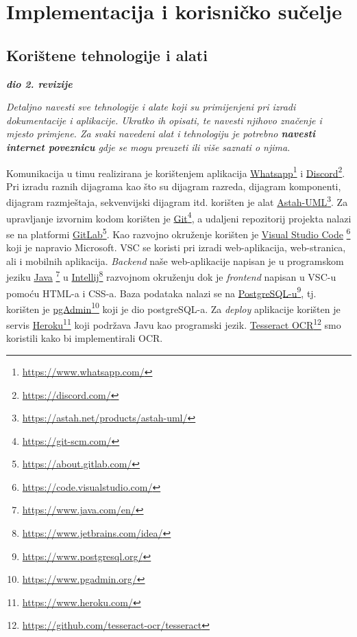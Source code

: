 \chapter{Implementacija i korisničko sučelje}
		
		
		\section{Korištene tehnologije i alati}
		
			\textbf{\textit{dio 2. revizije}}
			
			 \textit{Detaljno navesti sve tehnologije i alate koji su primijenjeni pri izradi dokumentacije i aplikacije. Ukratko ih opisati, te navesti njihovo značenje i mjesto primjene. Za svaki navedeni alat i tehnologiju je potrebno \textbf{navesti internet poveznicu} gdje se mogu preuzeti ili više saznati o njima}.
			 
			 Komunikacija u timu realizirana je korištenjem aplikacija \underline{Whatsapp}\footnote{\url{https://www.whatsapp.com/}} i \underline{Discord}\footnote{\url{https://discord.com/}}. Pri izradu raznih dijagrama kao što su dijagram razreda, dijagram komponenti, dijagram razmještaja, sekvenvijski dijagram itd. korišten je alat \underline{Astah-UML}\footnote{\url{https://astah.net/products/astah-uml/}}.
			 Za upravljanje izvornim kodom korišten je \underline{Git}\footnote{\url{https://git-scm.com/}}, a udaljeni repozitorij projekta nalazi se na platformi \underline{GitLab}\footnote{\url{https://about.gitlab.com/}}.
			 Kao razvojno okruženje korišten je \underline{Visual Studio Code} \footnote{\url{https://code.visualstudio.com/}} koji je napravio Microsoft. VSC se koristi pri izradi web-aplikacija, web-stranica, ali i mobilnih aplikacija.
			 \textit{Backend} naše web-aplikacije napisan je u programskom jeziku \underline{Java} \footnote{\url{https://www.java.com/en/}} u \underline{Intellij}\footnote{\url{https://www.jetbrains.com/idea/}} razvojnom okruženju dok je \textit{frontend} napisan u VSC-u pomoću HTML-a i CSS-a. Baza podataka nalazi se na \underline{PostgreSQL-u}\footnote{\url{https://www.postgresql.org/}}, tj. korišten je \underline{pgAdmin}\footnote{\url{https://www.pgadmin.org/}} koji je dio postgreSQL-a. Za \textit{deploy} aplikacije korišten je servis \underline{Heroku}\footnote{\url{https://www.heroku.com/}} koji podržava Javu kao programski jezik. \underline{Tesseract OCR}\footnote{\url{https://github.com/tesseract-ocr/tesseract}} smo koristili kako bi implementirali OCR.
			
			\eject 
		
